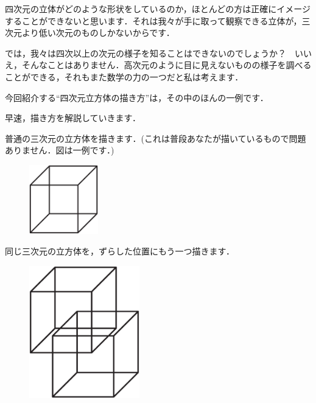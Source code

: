 \documentclass[./main]{subfiles} %
\begin{document}

\newtheorem{maskdefi}{定義}
\newtheorem{rem}{注意}


四次元の立体がどのような形状をしているのか，ほとんどの方は正確にイメージすることができないと思います．それは我々が手に取って観察できる立体が，三次元より低い次元のものしかないからです．

では，我々は四次以上の次元の様子を知ることはできないのでしょうか？　いいえ，そんなことはありません．高次元のように目に見えないものの様子を調べることができる，それもまた数学の力の一つだと私は考えます．

今回紹介する``四次元立方体の描き方''は，その中のほんの一例です．

早速，描き方を解説していきます．


普通の三次元の立方体を描きます．(これは普段あなたが描いているもので問題ありません．図は一例です．)

\begin{figure}[h]
\begin{center}
\includegraphics[width=30mm]{mask_rittai1.eps}
\end{center}
\end{figure}


同じ三次元の立方体を，ずらした位置にもう一つ描きます．

\begin{figure}[h]
\begin{center}
\includegraphics[width=48mm]{mask_rittai2.eps}
\end{center}
\end{figure}
\end{document}
